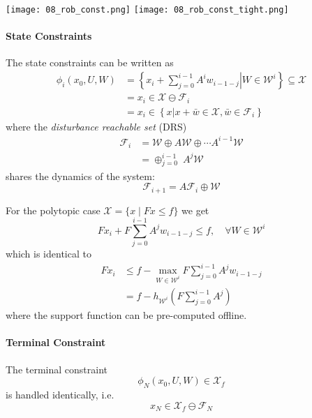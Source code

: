 \begin{center}
    \texttt{[image: 08\_rob\_const.png]}
    \texttt{[image: 08\_rob\_const\_tight.png]}
\end{center}

\paragraph{State Constraints}
The state constraints can be written as
\begin{align*}
    \phi_i(x_0,U,W) & =\left\{\left.x_i+\sum_{j=0}^{i-1}A^i w_{i-1-j}\right|W\in \mathcal{W}^i\right\}\subseteq\mathcal{X} \\
                    & = x_i \in \mathcal{X} \ominus \mathcal{F}_i                                                          \\
                    & = x_i \in \left\{x \big| x+\bar{w}\in \mathcal{X}, \bar{w}\in \mathcal{F}_i\right\}
\end{align*}
where the \textit{disturbance reachable set} (DRS)
\begin{align*}
    \mathcal{F}_i & = \mathcal{W} \oplus A \mathcal{W} \oplus \cdots A^{i-1} \mathcal{W} \\
                  & = \oplus_{j=0}^{i-1}\; A^{j} \mathcal{W}
\end{align*}
shares the dynamics of the system:
\begin{equation*}
    \mathcal{F}_{i+1} = A\mathcal{F}_i \oplus \mathcal{W}
\end{equation*}
\newpar{}

For the polytopic case $\mathcal{X} = \{x \mid Fx \leq f\}$ we get
\begin{equation*}
    Fx_i + F \sum_{j=0}^{i-1} A^j w_{i-1-j} \leq f, \quad \forall W \in \mathcal{W}^i
\end{equation*}
which is identical to
\begin{align*}
    Fx_i & \leq f - \max_{W \in \mathcal{W}^i} F \sum_{j=0}^{i-1} A^j w_{i-1-j} \\
         & = f - h_{\mathcal{W}^i} \left(F \sum_{j=0}^{i-1} A^j\right)
\end{align*}
where the support function can be pre-computed offline.
\paragraph{Terminal Constraint}
The terminal constraint
\begin{equation*}
    \phi_N(x_0, U, W)\in \mathcal{X}_f
\end{equation*}
is handled identically, i.e.\
\begin{equation*}
    x_N \in \mathcal{X}_f \ominus \mathcal{F}_N
\end{equation*}

